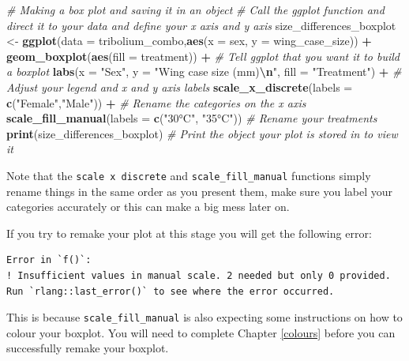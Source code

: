 \documentclass[
]{book}
\newenvironment{Shaded}{\begin{snugshade}}{\end{snugshade}}
\newcommand{\AttributeTok}[1]{\textcolor[rgb]{0.13,0.29,0.53}{#1}}
\newcommand{\CommentTok}[1]{\textcolor[rgb]{0.56,0.35,0.01}{\textit{#1}}}
\newcommand{\FunctionTok}[1]{\textcolor[rgb]{0.13,0.29,0.53}{\textbf{#1}}}
\newcommand{\NormalTok}[1]{#1}
\newcommand{\OtherTok}[1]{\textcolor[rgb]{0.56,0.35,0.01}{#1}}
\newcommand{\SpecialCharTok}[1]{\textcolor[rgb]{0.81,0.36,0.00}{\textbf{#1}}}
\newcommand{\StringTok}[1]{\textcolor[rgb]{0.31,0.60,0.02}{#1}}
\begin{document}
\begin{Shaded}
\begin{Highlighting}[]
\CommentTok{\# Making a box plot and saving it in an object}
\CommentTok{\# Call the ggplot function and direct it to your data and define your x axis and y axis}
\NormalTok{size\_differences\_boxplot }\OtherTok{\textless{}{-}} \FunctionTok{ggplot}\NormalTok{(}\AttributeTok{data =}\NormalTok{ tribolium\_combo,}\FunctionTok{aes}\NormalTok{(}\AttributeTok{x =}\NormalTok{ sex, }\AttributeTok{y =}\NormalTok{ wing\_case\_size)) }\SpecialCharTok{+} 
  \FunctionTok{geom\_boxplot}\NormalTok{(}\FunctionTok{aes}\NormalTok{(}\AttributeTok{fill =}\NormalTok{ treatment)) }\SpecialCharTok{+} \CommentTok{\# Tell ggplot that you want it to build a boxplot}
  \FunctionTok{labs}\NormalTok{(}\AttributeTok{x =} \StringTok{"Sex"}\NormalTok{, }\AttributeTok{y =} \StringTok{"Wing case size (mm)}\SpecialCharTok{\textbackslash{}n}\StringTok{"}\NormalTok{, }\AttributeTok{fill =} \StringTok{"Treatment"}\NormalTok{) }\SpecialCharTok{+} \CommentTok{\# Adjust your legend and x and y axis labels }
  \FunctionTok{scale\_x\_discrete}\NormalTok{(}\AttributeTok{labels =} \FunctionTok{c}\NormalTok{(}\StringTok{"Female"}\NormalTok{,}\StringTok{"Male"}\NormalTok{)) }\SpecialCharTok{+} \CommentTok{\# Rename the categories on the x axis }
  \FunctionTok{scale\_fill\_manual}\NormalTok{(}\AttributeTok{labels =} \FunctionTok{c}\NormalTok{(}\StringTok{"30°C"}\NormalTok{, }\StringTok{"35°C"}\NormalTok{)) }\CommentTok{\# Rename your treatments}
\FunctionTok{print}\NormalTok{(size\_differences\_boxplot) }\CommentTok{\# Print the object your plot is stored in to view it}
\end{Highlighting}
\end{Shaded}

Note that the \texttt{scale\ x\ discrete} and \texttt{scale\_fill\_manual} functions simply rename things in the same order as you present them, make sure you label your categories accurately or this can make a big mess later on.

If you try to remake your plot at this stage you will get the following error:

\begin{verbatim}
Error in `f()`:
! Insufficient values in manual scale. 2 needed but only 0 provided.
Run `rlang::last_error()` to see where the error occurred.
\end{verbatim}

This is because \texttt{scale\_fill\_manual} is also expecting some instructions on how to colour your boxplot. You will need to complete Chapter \ref{colours} before you can successfully remake your boxplot.
\end{document}
